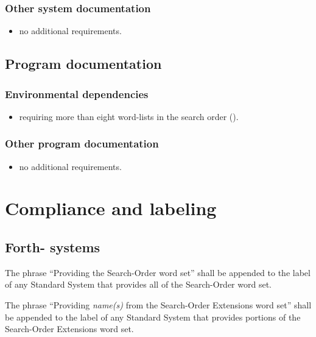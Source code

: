 \subsubsection{Other system documentation} %

\begin{itemize}
\item no additional requirements.
\end{itemize}

\subsection{Program documentation} %

\subsubsection{Environmental dependencies} %

\begin{itemize}
\item requiring more than eight word-lists in the search order
	().
\end{itemize}

\subsubsection{Other program documentation} %

\begin{itemize}
\item no additional requirements.
\end{itemize}


\enlargethispage{4ex}
\section{Compliance and labeling} %

\subsection{Forth-\snapshot{} systems} %

The phrase ``Providing the Search-Order word set'' shall be
appended to the label of any Standard System that provides all of
the Search-Order word set.

The phrase ``Providing \emph{name(s)} from the Search-Order
Extensions word set'' shall be appended to the label of any
Standard System that provides portions of the Search-Order
Extensions word set.

